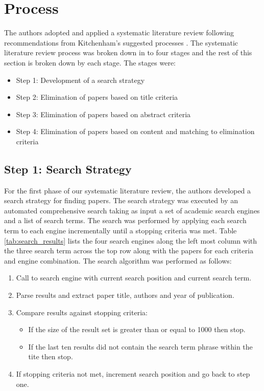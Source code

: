 \section{Process} \label{sec:process}

The authors adopted and applied a systematic literature review following recommendations from Kitchenham's suggested processes \cite{kitchenham2007guidelines}.  The systematic literature review process was broken down in to four stages and the rest of this section is broken down by each stage.  The stages were:

\begin{itemize}
\setlength{\itemsep}{0.25pt}
\item Step 1: Development of a search strategy
\item Step 2: Elimination of papers based on title criteria
\item Step 3: Elimination of papers based on abstract criteria
\item Step 4: Elimination of papers based on content and matching to elimination criteria
\end{itemize}

\subsection{Step 1: Search Strategy}

For the first phase of our systematic literature review, the authors developed a search strategy for finding papers.  The search strategy was executed by an automated comprehensive search taking as input a set of academic search engines and a list of search terms.  The search was performed by applying each search term to each engine incrementally until a stopping criteria was met. Table \ref{tab:search_results} lists the four search engines along the left most column with the three search term across the top row along with the papers for each criteria and engine combination.  The search algorithm was performed as follows:

\begin{enumerate}
\setlength{\itemsep}{0.25pt}
\item Call to search engine with current search position and current search term.
\item Parse results and extract paper title, authors and year of publication.
\item Compare results against stopping criteria:
	\begin{itemize}
	\item If the size of the result set is greater than or equal to 1000 then stop.
	\item If the last ten results did not contain the search term phrase within the tite then stop.
	\end{itemize}
\item If stopping criteria not met, increment search position and go back to step one.
\end{enumerate}

